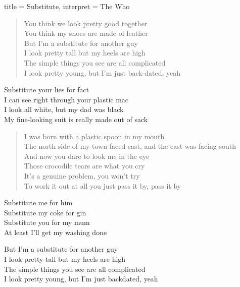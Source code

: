 \begin{song}
    {title = {Substitute}, interpret = {The Who}}

    \begin{verse}
        You think we look pretty good together \\
        You think my shoes are made of leather \\
        But I'm a substitute for another guy \\
        I look pretty tall but my heels are high \\
        The simple things you see are all complicated \\
        I look pretty young, but I'm just back-dated, yeah
    \end{verse}

    \begin{chorus}
        Substitute your lies for fact \\
        I can see right through your plastic mac \\
        I look all white, but my dad was black \\
        My fine-looking suit is really made out of sack
    \end{chorus}
    \begin{verse}
        I was born with a plastic spoon in my mouth \\
        The north side of my town faced east, and the east was facing south \\
        And now you dare to look me in the eye \\
        Those crocodile tears are what you cry \\
        It's a genuine problem, you won't try \\
        To work it out at all you just pass it by, pass it by
    \end{verse}

    \begin{chorus}
        Substitute me for him \\
        Substitute my coke for gin \\
        Substitute you for my mum \\
        At least I'll get my washing done
    \end{chorus}

    \begin{chorus}
        But I'm a substitute for another guy \\
        I look pretty tall but my heels are high \\
        The simple things you see are all complicated \\
        I look pretty young, but I'm just backdated, yeah
    \end{chorus}



\end{song}
